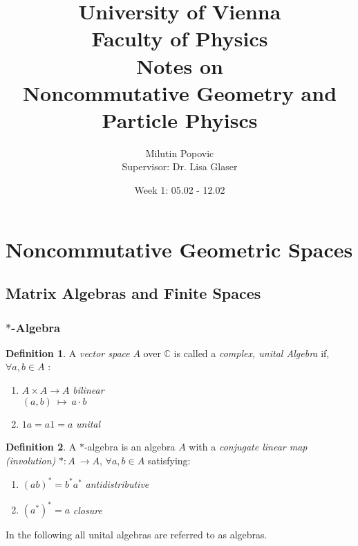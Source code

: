 \documentclass[a4paper]{article}
\title{University of Vienna\\ Faculty of Physics\\ \vspace{1.25cm}
Notes on\\ Noncommutative Geometry and Particle Phyiscs}
\date{Week 1: 05.02 - 12.02}
\author{Milutin Popovic \\ Supervisor: Dr. Lisa
Glaser}
\theoremstyle{definition}
\newtheorem{definition}{Definition}
\theoremstyle{definition}
\theoremstyle{definition}
\theoremstyle{theorem}
\theoremstyle{theorem}
\begin{document}
    \maketitle
    \tableofcontents
    \newpage

\section{Noncommutative Geometric Spaces}
\subsection{Matrix Algebras and Finite Spaces}
\subsubsection{$*$-Algebra}
\begin{definition}
    A \textit{vector space} $A$ over $\mathbb{C}$ is called a \textit{complex, unital Algebra} if, \\
    $\forall a,b \in A$ :
    \begin{enumerate}
        \item
            $A \times A \rightarrow A$       \hspace{0.1\textwidth} \textit{bilinear} \\
            $(a, b)\ \mapsto \ a\cdot b$
        \item
            $1a = a1 =a$                     \hspace{0.08\textwidth}  \textit{unital} \\
    \end{enumerate}
\end{definition}

\begin{definition}
    A $*$-algebra is an algebra $A$ with a \textit{conjugate linear map (involution)} $*:A\ \rightarrow  A$,
    $\forall a, b \in A$ satisfying:
    \begin{enumerate}
        \item
            $(ab)^* = b^*a^*$         \hspace{0.05\textwidth} \textit{antidistributive}
        \item
            $(a^*)^* = a$                   \hspace{0.1\textwidth} \textit{closure}
    \end{enumerate}
\end{definition}
In the following all unital algebras are referred to as algebras.
\end{document}
